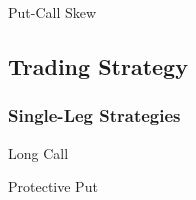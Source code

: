 \documentclass[10pt]{article}
\begin{document}
    \begin{core}{Put-Call Skew}


    \end{core}

  \subsection{Trading Strategy}

    \subsubsection{Single-Leg Strategies}

      \begin{core}{Long Call}


      \end{core}

      \begin{core}{Protective Put}


      \end{core}
\end{document}
